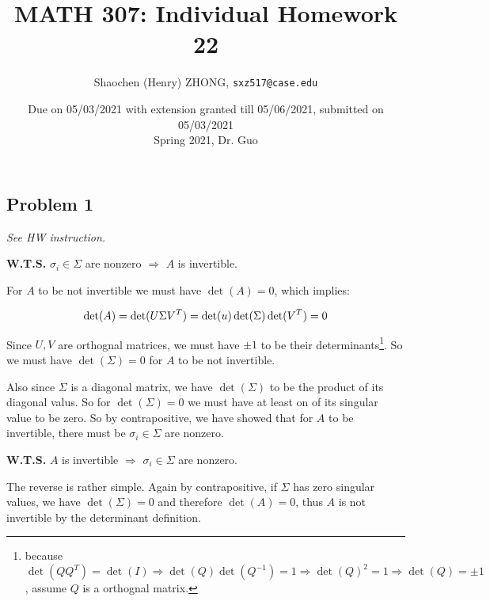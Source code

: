 \documentclass[11pt]{article}
\newcommand{\ilc}{\texttt}
\begin{document}
\title{\textbf{MATH 307: Individual Homework 22}}


\author{Shaochen (Henry) ZHONG, \ilc{sxz517@case.edu}}

\date{Due on 05/03/2021 with extension granted till 05/06/2021, submitted on 05/03/2021 \\ Spring 2021, Dr. Guo}
\maketitle



\subsection*{Problem 1}
\textit{See HW instruction.}\newline

\noindent\textbf{W.T.S.}  $\sigma_i \in \Sigma$ are nonzero $\Longrightarrow$ $A$ is invertible.

For $A$ to be not invertible we must have $\det(A) = 0$, which implies:

\begin{equation*}
    \det(A) = \det(U \Sigma V^T) = \det(u) \det(\Sigma)  \det(V^T) = 0 \\
\end{equation*}

Since $U, V$ are orthognal matrices, we must have $\pm 1$ to be their determinants\footnote{because $\det(Q Q^T) = \det(I) \Longrightarrow \det(Q) \det(Q^{-1}) = 1 \Longrightarrow \det(Q)^2  =  1 \Longrightarrow \det(Q) = \pm 1$, assume $Q$ is a orthognal matrix.}. So we must have $\det(\Sigma) = 0$ for $A$ to be not invertible.

Also since $\Sigma$ is a diagonal matrix, we have $\det(\Sigma)$ to be the product of its diagonal valus. So for $\det(\Sigma) = 0$ we must have at least on of its singular value to be zero. So by contrapositive, we have showed that for $A$ to be invertible, there must be  $\sigma_i \in \Sigma$ are nonzero.\newline

\noindent\textbf{W.T.S.} $A$ is invertible $\Longrightarrow$ $\sigma_i \in \Sigma$ are nonzero.

The reverse is rather simple. Again by contrapositive, if $\Sigma$ has zero singular values, we have $\det(\Sigma) = 0$ and therefore $\det(A) = 0$, thus $A$ is not invertible by the determinant definition.\newline
\end{document}
